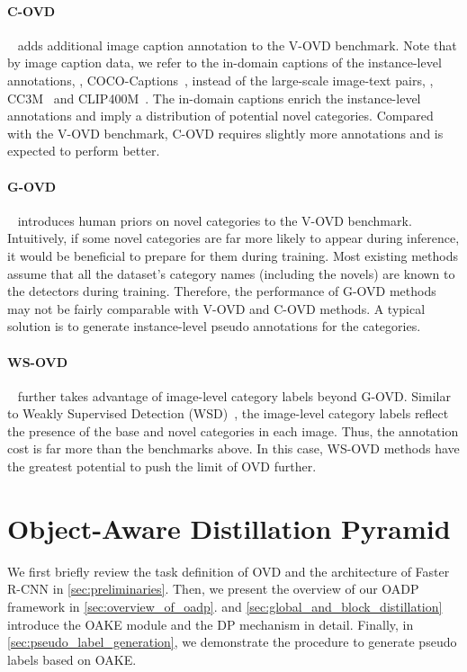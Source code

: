 \documentclass[10pt,twocolumn,letterpaper]{article}
\def\OADP{Object-Aware Distillation Pyramid}
\begin{document}
\paragraph{C-OVD}~\cite{hierkd, ovr_cnn, locov, pb_ovd} adds additional image caption annotation to the V-OVD benchmark.
Note that by image caption data, we refer to the in-domain captions of the instance-level annotations, \eg, COCO-Captions~\cite{coco_captions}, instead of the large-scale image-text pairs, \eg, CC3M~\cite{cc} and CLIP400M~\cite{clip}.
The in-domain captions enrich the instance-level annotations and imply a distribution of potential novel categories.
Compared with the V-OVD benchmark, C-OVD requires slightly more annotations and is expected to perform better.

\paragraph{G-OVD}~\cite{ov_detr, vl_plm, promptdet} introduces human priors on novel categories to the V-OVD benchmark.
Intuitively, if some novel categories are far more likely to appear during inference, it would be beneficial to prepare for them during training.
Most existing methods assume that all the dataset's category names (including the novels) are known to the detectors during training.
Therefore, the performance of G-OVD methods may not be fairly comparable with V-OVD and C-OVD methods.
A typical solution is to generate instance-level pseudo annotations for the categories.

\paragraph{WS-OVD}~\cite{detic} further takes advantage of image-level category labels beyond G-OVD.
Similar to Weakly Supervised Detection (WSD)~\cite{wsdnn, cap2det}, the image-level category labels reflect the presence of the base and novel categories in each image.
Thus, the annotation cost is far more than the benchmarks above.
In this case, WS-OVD methods have the greatest potential to push the limit of OVD further.
 
\section{\OADP{}}

We first briefly review the task definition of OVD and the architecture of Faster R-CNN in \cref{sec:preliminaries}.
Then, we present the overview of our OADP framework in \cref{sec:overview_of_oadp}.
 and \cref{sec:global_and_block_distillation} introduce the OAKE module and the DP mechanism in detail.
Finally, in \cref{sec:pseudo_label_generation}, we demonstrate the procedure to generate pseudo labels based on OAKE.
 
\end{document}
